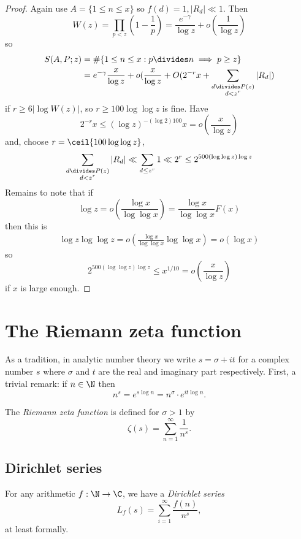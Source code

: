 \documentclass[a4paper]{article}
\theoremstyle{definition}
\begin{document}
\begin{proof}
  Again use \(A = \{1 \leq n \leq x\}\) so \(f(d) = 1, |R_d| \ll 1\). Then
  \[
    W(z)
    = \prod_{p < z} (1 - \frac{1}{p})
    = \frac{e^{-\gamma}}{\log z} + o(\frac{1}{\log z})
  \]
  so
  \begin{align*}
    S(A, P; z)
    &= \#\{1 \leq n \leq x: p \divides n \implies p \geq z\} \\
    &= e^{-\gamma} \frac{x}{\log z} + o(\frac{x}{\log z} + O(2^{-r} x + \sum_{\substack{d \divides P(z) \\ d < z^r}} |R_d|)
  \end{align*}
  if \(r \geq 6 |\log W(z)|\), so \(r \geq 100 \log \log z\) is fine. Have
  \[
    2^{-r} x \leq (\log z)^{- (\log 2) 100} x = o(\frac{x}{\log z})
  \]
  and, choose \(r = \ceil{100 \log \log z}\),
  \[
    \sum_{\substack{d \divides P(z) \\ d < z^r}} |R_d|
    \ll \sum_{d \leq z^r} 1
    \ll 2^r
    \leq 2^{500 (\log \log z) \log z}
  \]
  Remains to note that if
  \[
    \log z = o(\frac{\log x}{\log \log x}) = \frac{\log x}{\log \log x} F(x)
  \]
  then this is
  \begin{align*}
    \log z \log \log z
    = o( \frac{\log x}{\log \log x} \log \log x)
    = o(\log x)
  \end{align*}
  so
  \[
    2^{500 (\log \log z) \log z} \leq x^{1/10} = o(\frac{x}{\log z})
  \]
  if \(x\) is large enough.
\end{proof}

\section{The Riemann zeta function}

As a tradition, in analytic number theory we write \(s = \sigma + it\) for a complex number \(s\) where \(\sigma\) and \(t\) are the real and imaginary part respectively. First, a trivial remark: if \(n \in \N\) then
\[
  n^s = e^{s \log n} = n^\sigma \cdot e^{it \log n}.
\]

The \emph{Riemann zeta function} is defined for \(\sigma > 1\) by
\[
  \zeta(s) = \sum_{n = 1}^\infty \frac{1}{n^s}.
\]

\subsection{Dirichlet series}

For any arithmetic \(f: \N \to \C\), we have a \emph{Dirichlet series}
\[
  L_f(s) = \sum_{i = 1}^\infty \frac{f(n)}{n^s},
\]
at least formally.
\end{document}
